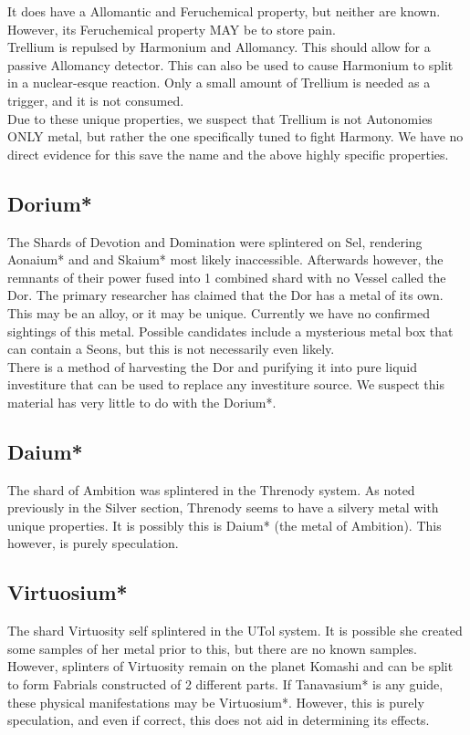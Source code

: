 \documentclass[conference]{IEEEtran}
\newcommand{\n}{\hfill\break}
\begin{document}
It does have a Allomantic and Feruchemical property, but neither are known.  However, its Feruchemical property MAY be to store pain.\cite{TLM-CH34}\\

Trellium is repulsed by Harmonium and Allomancy.\cite{TLM-CH16}  This should allow for a passive Allomancy detector.  This can also be used to cause Harmonium to split in a nuclear-esque reaction.\cite{TLM-CH16}\cite{TLM-CH71}  Only a small amount of Trellium is needed as a trigger, and it is not consumed.\\

Due to these unique properties, we suspect that Trellium is not Autonomies ONLY metal, but rather the one specifically tuned to fight Harmony.  We have no direct evidence for this save the name and the above highly specific properties.\n 
\subsection*{\textbf{Dorium}*}
The Shards of Devotion and Domination were splintered on Sel,\cite{arcanum-sel}\cite{WoK-ep22} rendering Aonaium* and and Skaium* most likely inaccessible.  Afterwards however, the remnants of their power fused into 1 combined shard with no Vessel called the Dor.\cite{arcanum-sel}  The primary researcher has claimed that the Dor has a metal of its own.\cite{dorium}  This may be an alloy, or it may be unique.  Currently we have no confirmed sightings of this metal.  Possible candidates include a mysterious metal box that can contain a Seons, but this is not necessarily even likely.  \\

There is a method of harvesting the Dor and purifying it into pure liquid investiture that can be used to replace any investiture source.\cite{TLM-CH64}  We suspect this material has very little to do with the Dorium*.\n
\subsection*{\textbf{Daium}*}
The shard of Ambition was splintered in the Threnody system.\cite{arcanum-thren}  As noted previously in the Silver section, Threnody seems to have a silvery metal with unique properties.\cite{SFSFH-CH3}\cite{anchor}\cite{RoW-CH64}   It is possibly this is Daium* (the metal of Ambition).  This however, is purely speculation. 
\n

\subsection*{\textbf{Virtuosium}*}
The shard Virtuosity self splintered in the UTol system.\cite{Yumi-CH1} It is possible she created some samples of her metal prior to this, but there are no known samples.  However, splinters of Virtuosity remain on the planet Komashi and can be split to form Fabrials constructed of 2 different parts.\cite{Yumi-CH4}  If Tanavasium* is any guide, these physical manifestations may be Virtuosium*.  However, this is purely speculation, and even if correct, this does not aid in determining its effects.
\end{document}

